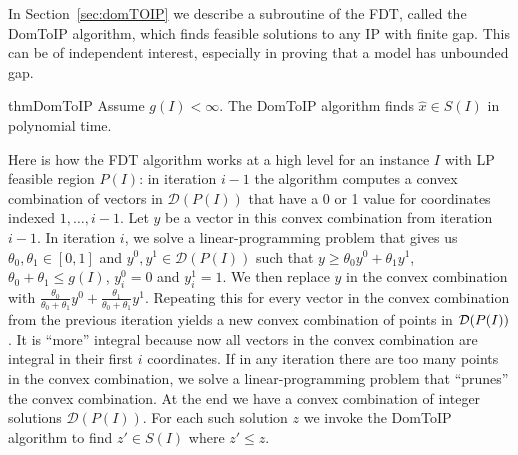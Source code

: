 In Section~\ref{sec:domTOIP} we describe a subroutine of the FDT, called the DomToIP algorithm, which finds feasible solutions to any IP with finite gap. This can be of independent interest, especially in proving that a model has unbounded gap.
\begin{restatable}{thm}{DomToIP}
	\label{domtoIP}
	Assume $g(I) < \infty$. The DomToIP algorithm finds $\hat{x}\in S(I)$ in polynomial time.
\end{restatable}


Here is how the FDT algorithm works at a high level for an instance $I$ with LP feasible region $P(I)$: in iteration $i-1$ the algorithm computes a convex combination of vectors in $\mathcal{D}(P(I))$ that have a 0 or 1 value for coordinates indexed $1,\ldots,i-1$. Let $y$ be a vector in this convex combination from iteration $i-1$. In iteration $i$, we solve a linear-programming problem that gives us $\theta_0,\theta_1\in [0,1]$ and $y^0,y^1\in \mathcal{D}(P(I))$ such that $y\geq \theta_0 y^0 + \theta_1 y^1$, $\theta_0+\theta_1\leq g(I)$, $y^0_i=0$ and $y^1_i=1$. We then replace $y$ in the convex combination with $\frac{\theta_0}{\theta_0+\theta_1}y^0 +\frac{\theta_1}{\theta_0+\theta_1}y^1$.  Repeating this for every vector in the convex combination from the previous iteration yields a new convex combination of points in $\operatorname{\mathcal{D}}(P(I))$. It is ``more'' integral because now all vectors in the convex combination are integral in their first $i$ coordinates. If in any iteration there are too many points in the convex combination,  we solve a linear-programming problem that ``prunes'' the convex combination. At the end we have a convex combination of integer solutions $\mathcal{D}(P(I))$. For each such solution $z$ we invoke the DomToIP algorithm
to find $z'\in S(I)$ where $z'\leq z$.


